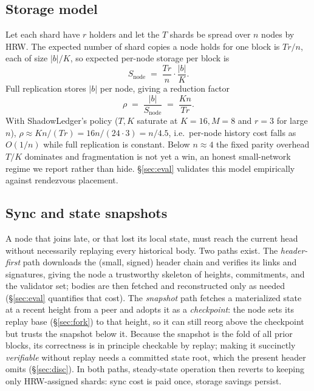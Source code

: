 \subsection{Storage model}
\label{sec:storagemodel}
Let each shard have $r$ holders and let the $T$ shards be spread over $n$ nodes by HRW. The
expected number of shard copies a node holds for one block is $Tr/n$, each of size $|b|/K$, so
expected per-node storage per block is
\[
S_{\text{node}} \;=\; \frac{Tr}{n}\cdot\frac{|b|}{K}.
\]
Full replication stores $|b|$ per node, giving a reduction factor
\[
\rho \;=\; \frac{|b|}{S_{\text{node}}} \;=\; \frac{Kn}{Tr}.
\]
With ShadowLedger's policy ($T,K$ saturate at $K{=}16,M{=}8$ and $r{=}3$ for large $n$),
$\rho \approx Kn/(Tr) = 16n/(24\cdot3)=n/4.5$, i.e.\ per-node history cost falls as
$O(1/n)$ while full replication is constant. Below $n\!\approx\!4$ the fixed parity overhead
$T/K$ dominates and fragmentation is not yet a win, an honest small-network regime we report
rather than hide. \S\ref{sec:eval} validates this model empirically against rendezvous
placement.

\subsection{Sync and state snapshots}
\label{sec:sync}
A node that joins late, or that lost its local state, must reach the current head without
necessarily replaying every historical body. Two paths exist. The \emph{header-first} path
downloads the (small, signed) header chain and verifies its links and signatures, giving the node
a trustworthy skeleton of heights, commitments, and the validator set; bodies are then fetched and
reconstructed only as needed (\S\ref{sec:eval} quantifies that cost). The \emph{snapshot} path
fetches a materialized state at a recent height from a peer and adopts it as a \emph{checkpoint}:
the node sets its replay base (\S\ref{sec:fork}) to that height, so it can still reorg above the
checkpoint but trusts the snapshot below it. Because the snapshot is the fold of all prior blocks,
its correctness is in principle checkable by replay; making it succinctly \emph{verifiable}
without replay needs a committed state root, which the present header omits (\S\ref{sec:disc}). In
both paths, steady-state operation then reverts to keeping only HRW-assigned shards: sync cost is
paid once, storage savings persist.
